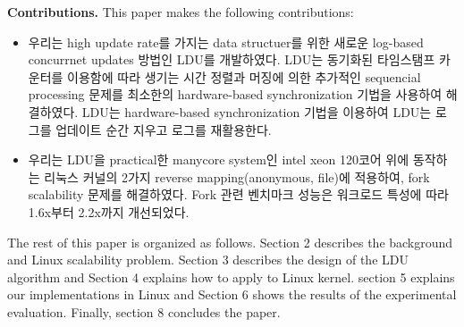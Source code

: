 \ifkor
\noindent
\textbf{Contributions.} This paper makes the following contributions:
\begin{itemize}
\item 우리는 high update rate를 가지는 data structuer를 위한 새로운 log-based
concurrnet updates 방법인 LDU를 개발하였다.
LDU는 동기화된 타임스탬프 카운터를 이용함에 따라 생기는 시간 정렬과 머징에 의한 추가적인 sequencial processing 문제를
최소한의 hardware-based synchronization 기법을 사용하여 해결하였다.
LDU는 hardware-based synchronization 기법을 이용하여 LDU는 로그를 업데이트 순간 지우고 로그를 재활용한다.
\item 우리는 LDU을 practical한 manycore system인 intel xeon 120코어 위에 동작하는 리눅스 커널의
2가지 reverse mapping(anonymous, file)에 적용하여, fork scalability 문제를 해결하였다.
Fork 관련 벤치마크 성능은 워크로드 특성에 따라 1.6x부터 2.2x까지 개선되었다.
\end{itemize}
\else
\fi


\ifkor
The rest of this paper is organized as follows.
Section 2 describes the background and Linux scalability problem.
Section 3 describes the design of the LDU algorithm and 
Section 4 explains how to apply to Linux kernel.
section 5 explains our implementations in Linux and
Section 6 shows the results of the experimental evaluation. 
Finally, section 8 concludes the paper.
\else
\fi

